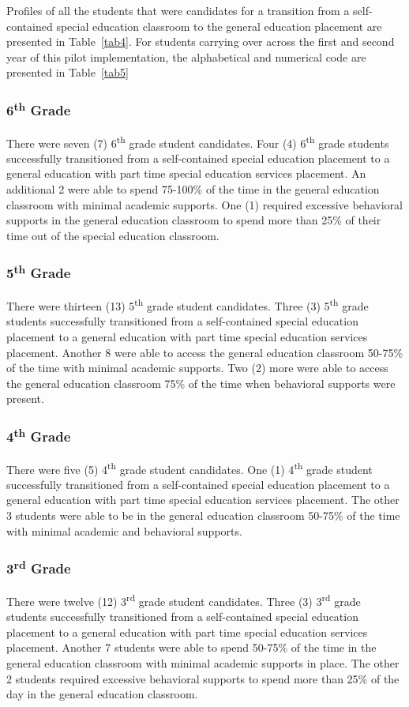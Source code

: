 \documentclass[twoside]{article}
\begin{document}
Profiles of all the students that were candidates for a transition from a self-contained special education classroom to the general education placement are presented in Table~\ref{tab4}. For students carrying over across the first and second year of this pilot implementation, the alphabetical and numerical code are presented in Table~\ref{tab5}

\subsubsection{6\textsuperscript{th} Grade}
There were seven (7) 6\textsuperscript{th} grade student candidates.
Four (4) 6\textsuperscript{th} grade students successfully transitioned from a self-contained special education placement to a general education with part time special education services placement. An additional 2 were able to spend 75-100\% of the time in the general education classroom with minimal academic supports. One (1) required excessive behavioral supports in the general education classroom to spend more than 25\% of their time out of the special education classroom. 

\subsubsection{5\textsuperscript{th} Grade}
There were thirteen (13) 5\textsuperscript{th} grade student candidates.
Three (3) 5\textsuperscript{th} grade students successfully transitioned from a self-contained special education placement to a general education with part time special education services placement. Another 8 were able to access the general education classroom 50-75\% of the time with minimal academic supports. Two (2) more were able to access the general education classroom 75\% of the time when behavioral supports were present. 

\subsubsection{4\textsuperscript{th} Grade}
There were five (5) 4\textsuperscript{th} grade student candidates.
One (1) 4\textsuperscript{th} grade student successfully transitioned from a self-contained special education placement to a general education with part time special education services placement. The other 3 students were able to be in the general education classroom 50-75\% of the time with minimal academic and behavioral supports.

\subsubsection{3\textsuperscript{rd} Grade}
There were twelve (12) 3\textsuperscript{rd} grade student candidates.
Three (3) 3\textsuperscript{rd} grade students successfully transitioned from a self-contained special education placement to a general education with part time special education services placement. Another 7 students were able to spend 50-75\% of the time in the general education classroom with minimal academic supports in place. The other 2 students required excessive behavioral supports to spend more than 25\% of the day in the general education classroom. 
\end{document}
